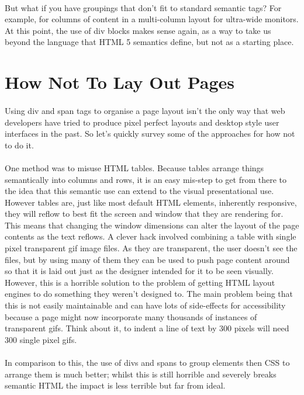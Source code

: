 \paragraph{} But what if you have groupings that don’t fit to standard semantic tags? For example, for columns of content in a multi-column layout for ultra-wide monitors. At this point, the use of div blocks makes sense again, as a way to take us beyond the language that HTML 5 semantics define, but not as a starting place.


\section{How Not To Lay Out Pages}
\paragraph{} Using div and span tags to organise a page layout isn't the only way that web developers have tried to produce pixel perfect layouts and desktop style user interfaces in the past. So let's quickly survey some of the approaches for how not to do it.
\paragraph{} One method was to misuse HTML tables. Because tables arrange things semantically into columns and rows, it is an easy mis-step to get from there to the idea that this semantic use can extend to the visual presentational use. However tables are, just like most default HTML elements, inherently responsive, they will reflow to best fit the screen and window that they are rendering for. This means that changing the window dimensions can alter the layout of the page contents as the text reflows. A clever hack involved combining a table with single pixel transparent gif image files. As they are transparent, the user doesn't see the files, but by using many of them they can be used to push page content around so that it is laid out just as the designer intended for it to be seen visually. However, this is a horrible solution to the problem of getting HTML layout engines to do something they weren’t designed to. The main problem being that this is not easily maintainable and can have lots of side-effects for accessibility because a page might now incorporate many thousands of instances of transparent gifs. Think about it, to indent a line of text by 300 pixels will need 300 single pixel gifs.
\paragraph{} In comparison to this, the use of divs and spans to group elements then CSS to arrange them is much better; whilst this is still horrible and severely breaks semantic HTML the impact is less terrible but far from ideal.



